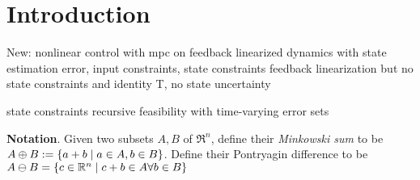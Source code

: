 \section{Introduction}
\label{sec:intro}

New:
nonlinear control with mpc on feedback linearized dynamics with state estimation error, input constraints, state constraints
	feedback linearization but no state constraints and identity T, no state uncertainty
	
state constraints
recursive feasibility with time-varying error sets

\textbf{Notation}.
Given two subsets $A,B$ of $\Re^n$, define their \textit{Minkowski sum} to be $A\oplus B := \{a+b \;|\; a\in A, b\in B\}$.
Define their Pontryagin difference to be $A\ominus B = \{c \in \mathbb{R}^n \;|\; c+b \in A \forall b \in B\}$